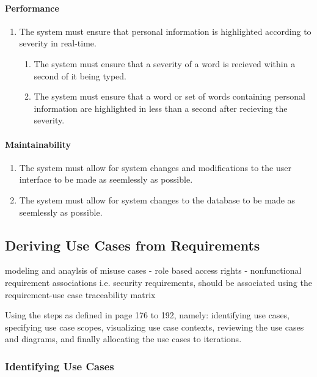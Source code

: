 \documentclass[11pt]{article}
\begin{document}
\paragraph{Performance}
\begin{enumerate}[label=R1.\arabic*.]
	\item The system must ensure that personal information is highlighted according to severity in real-time.
	\begin{enumerate}[label*=\arabic*.]
		\item The system must ensure that a severity of a word is recieved within a second of it being typed.
		\item The system must ensure that a word or set of words containing personal information are highlighted in less than a second after recieving the severity.
	\end{enumerate}
\end{enumerate}

\paragraph{Maintainability}
\begin{enumerate}[label=R1.\arabic*.]
	\item The system must allow for system changes and modifications to the user interface to be made as seemlessly as possible.
	\item The system must allow for system changes to the database to be made as seemlessly as possible.
\end{enumerate}

\subsection{Deriving Use Cases from Requirements}

modeling and anaylsis of misuse cases
- role based access rights
- nonfunctional requirement associations i.e. security requirements, should be associated using the requirement-use case traceability matrix

Using the steps as defined in \cite{Book:1} page 176 to 192, namely: identifying use cases, specifying use case scopes, visualizing use case contexts, reviewing the use cases and diagrams, and finally allocating the use cases to iterations.

\subsubsection{Identifying Use Cases}
\end{document}
